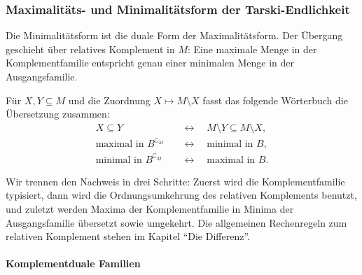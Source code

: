 \documentclass[main.tex]{subfiles}
\begin{document}
\begin{tabproof}
\end{tabproof}

\subsubsection[Max.- und Min.-Form der Tarski-Endlichkeit]{Maximalitäts- und Minimalitätsform der Tarski-Endlichkeit}

Die Minimalitätsform ist die duale Form der Maximalitätsform. Der Übergang
geschieht über relatives Komplement in \(M\): Eine maximale Menge in der
Komplementfamilie entspricht genau einer minimalen Menge in der
Ausgangsfamilie.

Für \(X,Y\subseteq M\) und die Zuordnung \(X\mapsto M\setminus X\) fasst das
folgende Wörterbuch die Übersetzung zusammen:
\[
\begin{aligned}
X\subseteq Y
  &\quad\longleftrightarrow\quad
  M\setminus Y\subseteq M\setminus X,\\
\text{maximal in }B^{\complement_M}
  &\quad\longleftrightarrow\quad
  \text{minimal in }B,\\
\text{minimal in }B^{\complement_M}
  &\quad\longleftrightarrow\quad
  \text{maximal in }B.
\end{aligned}
\]

Wir trennen den Nachweis in drei Schritte: Zuerst wird die Komplementfamilie
typisiert, dann wird die Ordnungsumkehrung des relativen Komplements benutzt,
und zuletzt werden Maxima der Komplementfamilie in Minima der Ausgangsfamilie
übersetzt sowie umgekehrt.
Die allgemeinen Rechenregeln zum relativen Komplement stehen im Kapitel
\enquote{Die Differenz}.

\paragraph{Komplementduale Familien}

\end{document}
